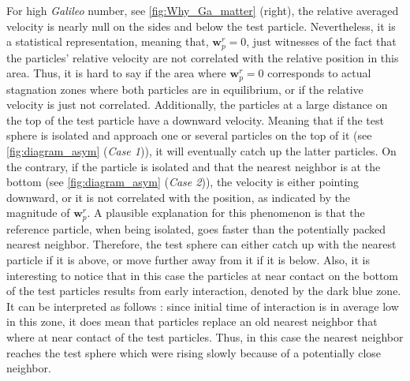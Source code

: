 

For high \textit{Galileo} number, see \ref{fig:Why_Ga_matter} (right), the relative averaged velocity is nearly null on the sides and below the test particle. 
Nevertheless, it is a statistical representation, meaning that, $\textbf{w}_p^r = 0$, just witnesses of the fact that the particles' relative velocity are not correlated with the relative position in this area. 
Thus, it is hard to say if the area where $\textbf{w}_p^r = 0$ corresponds to actual stagnation zones where both particles are in equilibrium, or if the relative velocity is just not correlated. 
Additionally, the particles at a large distance on the top of the test particle have a downward velocity. 
Meaning that if the test sphere is isolated and approach one or several  particles on the top of it (see \ref{fig:diagram_asym} (\textit{Case 1})), it will eventually catch up the latter particles. 
On the contrary, if the particle is isolated and that the nearest neighbor is at the bottom (see \ref{fig:diagram_asym} (\textit{Case 2})), the velocity is either pointing downward, or it is not correlated with the position, as indicated by the magnitude of $\textbf{w}_p^r$. 
A plausible explanation for this phenomenon is that the reference particle, when being isolated, goes faster than the potentially packed nearest neighbor.
Therefore, the test sphere can either catch up with the nearest particle if it is above, or move further away from it if it is below.
Also, it is interesting to notice that in this case the particles at near contact on the bottom of the test particles results from early interaction, denoted by the dark blue zone. 
It can be interpreted as follows : since 
initial time of interaction is in average low in this zone, it does mean that particles replace an old nearest neighbor that where at near contact of the test particles. 
Thus, in this case the nearest neighbor reaches the test sphere which were rising slowly because of a potentially close neighbor. 

